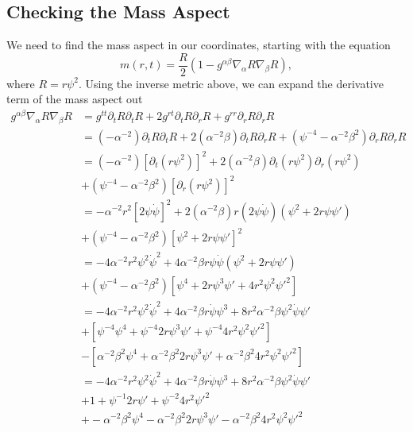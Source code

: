 \documentclass[12pt]{article}
\numberwithin{equation}{section}
\begin{document}
\subsection{Checking the Mass Aspect}
We need to find the mass aspect in our coordinates, starting with the equation
\begin{equation}
m(r, t) = \frac{R}{2} (1 - g^{\alpha \beta} \nabla_\alpha R \nabla_\beta R),
\end{equation}
where $R = r \psi^2$.  Using the inverse metric above, we can expand the derivative term of the mass aspect out
\begin{equation}
\begin{aligned}
g^{\alpha \beta} \nabla_\alpha R \nabla_\beta R &= g^{tt} \partial_t R \partial_t R + 2 g^{rt} \partial_t R \partial_r R + g^{rr} \partial_r R \partial_r R \\
&= (-\alpha^{-2}) \partial_t R \partial_t R + 2 (\alpha^{-2} \beta) \partial_t R \partial_r R + (\psi^{-4} - \alpha^{-2} \beta^2) \partial_r R \partial_r R \\
&= (-\alpha^{-2}) [\partial_t (r \psi^2)]^2 + 2 (\alpha^{-2} \beta) \partial_t (r \psi^2) \partial_r (r \psi^2) \\
&+ (\psi^{-4} - \alpha^{-2} \beta^2) [\partial_r (r \psi^2)]^2 \\
&= -\alpha^{-2} r^2 [2 \psi \dot{\psi}]^2 + 2 (\alpha^{-2} \beta) r (2 \psi \dot{\psi}) (\psi^2 + 2 r \psi \psi') \\
&+ (\psi^{-4} - \alpha^{-2} \beta^2) [\psi^2 + 2 r \psi \psi']^2 \\
&= -4 \alpha^{-2} r^2 \psi^2 \dot{\psi}^2 + 4 \alpha^{-2} \beta r \psi \dot{\psi} (\psi^2 + 2 r \psi \psi') \\
&+ (\psi^{-4} - \alpha^{-2} \beta^2) [\psi^4 + 2 r \psi^3 \psi' + 4 r^2 \psi^2 \psi'^2] \\
&= -4 \alpha^{-2} r^2 \psi^2 \dot{\psi}^2 + 4 \alpha^{-2} \beta r \dot{\psi} \psi^3 + 8 r^2 \alpha^{-2} \beta \psi^2 \dot{\psi} \psi' \\
&+ [\psi^{-4} \psi^4 + \psi^{-4} 2 r \psi^3 \psi' + \psi^{-4} 4 r^2 \psi^2 \psi'^2] \\
&- [\alpha^{-2} \beta^2 \psi^4 + \alpha^{-2} \beta^2 2 r \psi^3 \psi' + \alpha^{-2} \beta^2 4 r^2 \psi^2 \psi'^2] \\
&= -4 \alpha^{-2} r^2 \psi^2 \dot{\psi}^2 + 4 \alpha^{-2} \beta r \dot{\psi} \psi^3 + 8 r^2 \alpha^{-2} \beta \psi^2 \dot{\psi} \psi' \\
&+ 1 + \psi^{-1} 2 r \psi' + \psi^{-2} 4 r^2 \psi'^2 \\
&+ -\alpha^{-2} \beta^2 \psi^4 - \alpha^{-2} \beta^2 2 r \psi^3 \psi' - \alpha^{-2} \beta^2 4 r^2 \psi^2 \psi'^2 \\
\end{aligned}
\end{equation}
\end{document}
